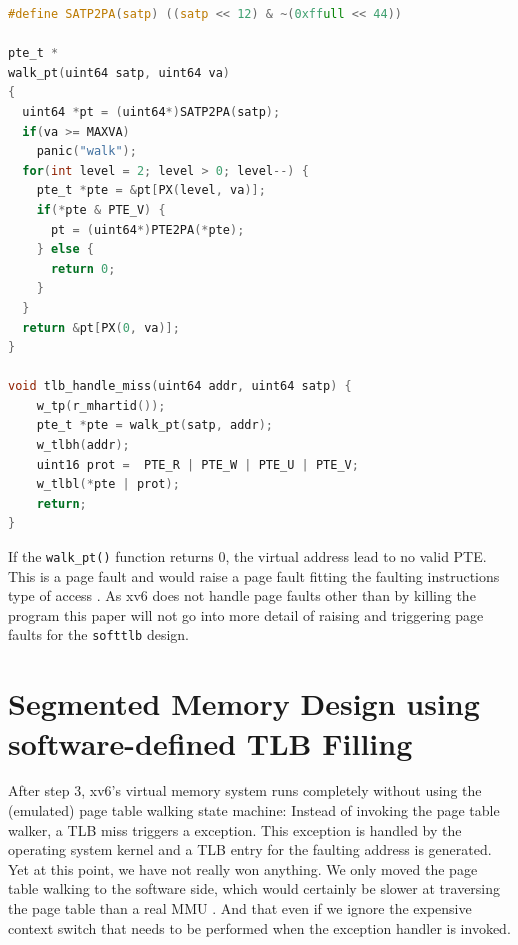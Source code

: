 \begin{lstlisting}[language=c,float=t,
    caption={\textbf{TLB Miss Exception Handler with Page Table Walk}
    The \texttt{walk\_pt()} function walks the Sv39 page table with the base address
    encoded in the \texttt{satp} register. If a PTE with the valid bit set is found, the function
    returns the address encoded in the PTE.
    Otherwise, the function returns \texttt{0}.},
    label={lst:softptw}]
#define SATP2PA(satp) ((satp << 12) & ~(0xffull << 44))

pte_t *
walk_pt(uint64 satp, uint64 va)
{
  uint64 *pt = (uint64*)SATP2PA(satp);
  if(va >= MAXVA)
    panic("walk");
  for(int level = 2; level > 0; level--) {
    pte_t *pte = &pt[PX(level, va)];
    if(*pte & PTE_V) {
      pt = (uint64*)PTE2PA(*pte);
    } else {
      return 0;
    }
  }
  return &pt[PX(0, va)];
}

void tlb_handle_miss(uint64 addr, uint64 satp) {
    w_tp(r_mhartid());
    pte_t *pte = walk_pt(satp, addr);
    w_tlbh(addr);
    uint16 prot =  PTE_R | PTE_W | PTE_U | PTE_V;
    w_tlbl(*pte | prot);
    return;
}
\end{lstlisting}


If the \texttt{walk\_pt()} function returns 0, the virtual address lead to no valid PTE. This is a
page fault and would raise a page fault fitting the faulting instructions type of access \cite{tanenbaumOS}.
As xv6 does not handle page faults other than by killing the program \cite{cox2011xv6} this
paper will not go into more detail of raising and triggering page faults for the \texttt{softtlb}
design.



\section{Segmented Memory Design using software-defined TLB Filling}

After step 3, xv6's virtual memory system runs completely without using the (emulated) page table
walking state machine:
Instead of invoking the page table walker, a TLB miss triggers a exception. This exception is handled by the
operating system kernel and a TLB entry for the faulting address is generated.
Yet at this point, we have not really won anything. We only moved the page table walking to the software side,
which would certainly be slower at traversing the page table than a real MMU \cite{jacob1998look}. And that
even if we ignore the expensive context switch that needs to be performed when the exception handler is invoked.

